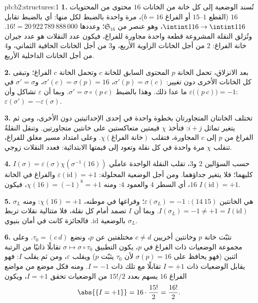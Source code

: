 \begin{solution}{pb:b2:structures:1}
\textbf{1.} تُسند الوضعية إلى كل خانة من الخانات $16$ محتوى
من المحتويات $16$ (القطع $1$--$15$ أو الفراغ $b = 16$)،
مرة واحدة بالضبط لكل منها: أي بالضبط تقابل $\intint1{16} \to
\intint1{16}$، وهو عنصر من $\mathfrak{S}_{16}$؛ وعددها $16!
= 20\,922\,789\,888\,000$. وتُزلق النقلة المشروعة قطعة واحدة
مجاورة للفراغ، فيكون عدد النقلات هو عدد جيران خانة
الفراغ: $2$ من أجل الخانات الزاوية الأربع،
و$3$ من أجل الخانات الحافية الثماني، و$4$ من أجل الخانات الداخلية الأربع.

\textbf{2.} بعد الانزلاق، تحمل الخانة $p$ المحتوى السابق للخانة
$c$ وتحمل الخانة $c$ الفراغ؛ وتبقى كل الخانات الأخرى دون تغيير:
$\sigma'(p) = \sigma(c)$، $\sigma'(c) = \sigma(p) = 16$،
و$\sigma' = \sigma$ في ما عدا ذلك. وهذا بالضبط $\sigma' = \sigma
\circ (p\ c)$. وبما أن $\varepsilon$ تشاكل وأن
$\varepsilon\bigl((p\ c)\bigr) = -1$:
$\varepsilon(\sigma') = -\varepsilon(\sigma)$.

\textbf{3.} تختلف الخانتان المتجاورتان بخطوة واحدة في إحدى
الإحداثيتين دون الأخرى، ومن ثم يتغير تماثل $i + j$: فتأخذ $\chi$
قيمتين متعاكستين على خانتين متجاورتين. وتنقل النقلةُ الفراغ
من $p$ إلى $c$ المجاورة، فتقلب $\chi(\text{خانة الفراغ})$.
وعلى امتداد مسير مغلق للفراغ، تنقلب $\chi$ مرة واحدة في كل نقلة
وتعود إلى قيمتها الابتدائية: فعدد النقلات زوجي.

\textbf{4.} حسب السؤالين 2 و3، تقلب النقلة الواحدة عاملَي
$I(\sigma) = \varepsilon(\sigma)\chi(\sigma^{-1}(16))$ كليهما؛ فلا يتغير
جداؤهما. ومن أجل الوضعية المحلولة:
$\varepsilon(\mathrm{id}) = +1$ والفراغ في الخانة $16$،
أي السطر $4$ والعمود $4$: ومنه $\chi(16) = (-1)^{8} = +1$، فيكون
$I(\mathrm{id}) = +1$.

\textbf{5.} $\sigma_L$ هي  الخانتين $(14\ 15)$:
$\varepsilon(\sigma_L) = -1$؛ وفراغها في موطنه، $\chi(16) = +1$:
ومنه $I(\sigma_L) = -1 \neq +1 = I(\mathrm{id})$. وبما أن $I$
تصمد أمام كل نقلة، فلا متتالية نقلات تربط $\sigma_L$
بالوضعية $\mathrm{id}$. فالجائزة كانت في أمان بنيوي.

\textbf{6.} نثبّت خانة $p$ وخانتين أخريين $c \neq d$
مختلفتين عن $p$، ونضع $\tau_0 = (c\ d)$. وعلى مجموعة
الوضعيات ذات الفراغ في $p$، يكون التطبيق $\sigma \mapsto \sigma
\circ \tau_0$ تقابلًا ذاتيًا من الرتبة اثنين (فهو يحافظ على $\sigma(p) = 16$
لأن $\tau_0$ يثبّت $p$) ويقلب $\varepsilon$، ومن ثم يقلب
$I$: فهو يقابل الوضعيات ذات $I = +1$ تقابلًا مع
تلك ذات $I = -1$. ومنه فكل موضع من مواضع الفراغ $16$
يسهم بعدد $15!/2$ من الوضعيات تحقق $I = +1$، ويكون
\[
\abs{\{I = +1\}} = 16 \cdot \frac{15!}{2} = \frac{16!}{2}.
\]


\end{solution}
